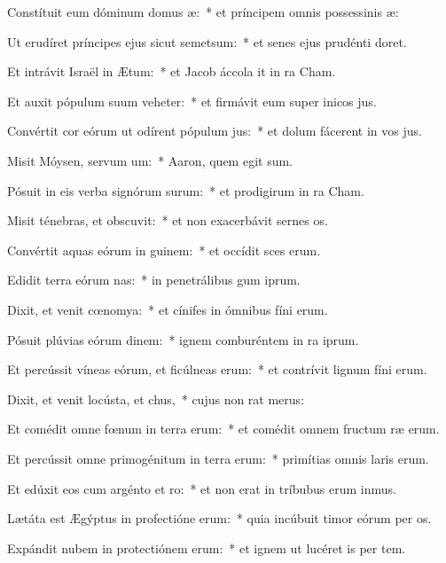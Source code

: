 \item Constítuit eum dóminum domus æ:~* et príncipem omnis possessinis æ:
\item Ut erudíret príncipes ejus sicut semetsum:~* et senes ejus prudénti doret.
\item Et intrávit Israël in Ætum:~* et Jacob áccola it in ra Cham.
\item Et auxit pópulum suum veheter:~* et firmávit eum super inicos jus.
\item Convértit cor eórum ut odírent pópulum jus:~* et dolum fácerent in vos jus.
\item Misit Móysen, servum um:~* Aaron, quem egit sum.
\item Pósuit in eis verba signórum surum:~* et prodigirum in ra Cham.
\item Misit ténebras, et obscuvit:~* et non exacerbávit sernes os.
\item Convértit aquas eórum in guinem:~* et occídit sces erum.
\item Edidit terra eórum nas:~* in penetrálibus gum iprum.
\item Dixit, et venit cœnomya:~* et cínifes in ómnibus fíni erum.
\item Pósuit plúvias eórum dinem:~* ignem comburéntem in ra iprum.
\item Et percússit víneas eórum, et ficúlneas erum:~* et contrívit lignum fíni erum.
\item Dixit, et venit locústa, et chus,~* cujus non rat merus:
\item Et comédit omne fœnum in terra erum:~* et comédit omnem fructum ræ erum.
\item Et percússit omne primogénitum in terra erum:~* primítias omnis laris erum.
\item Et edúxit eos cum argénto et ro:~* et non erat in tríbubus erum inmus.
\item Lætáta est Ægýptus in profectióne erum:~* quia incúbuit timor eórum per os.
\item Expándit nubem in protectiónem erum:~* et ignem ut lucéret is per tem.
